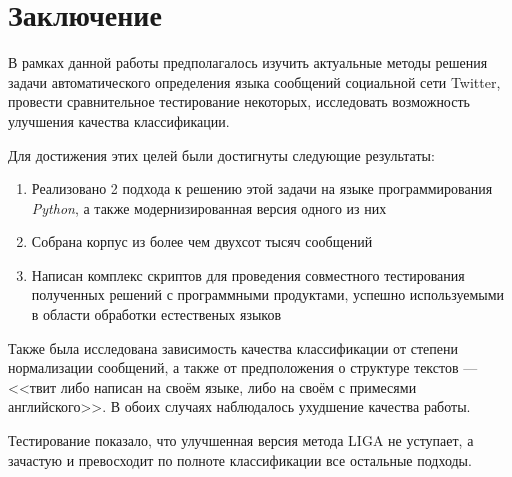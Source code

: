 \documentclass[a4paper, 14pt]{article}
\begin{document}
\section{Заключение}
		В рамках данной работы предполагалось изучить актуальные методы решения задачи автоматического определения языка сообщений социальной сети Twitter, провести сравнительное тестирование некоторых, исследовать возможность улучшения качества классификации. 
		
		Для достижения этих целей были достигнуты следующие результаты:
		\begin{enumerate}
			\item Реализовано 2 подхода к решению этой задачи на языке программирования \textit{Python}, а также модернизированная версия одного из них
			\item Собрана корпус из более чем двухсот тысяч сообщений
			\item Написан комплекс скриптов для проведения совместного тестирования полученных решений с программными продуктами, успешно используемыми в области обработки естественых языков
		\end{enumerate}
		Также была исследована зависимость качества классификации от степени нормализации сообщений, а также от предположения о структуре текстов ---
		<<твит либо написан на своём языке, либо на своём с примесями английского>>. В обоих случаях наблюдалось ухудшение качества работы.
		
		Тестирование показало, что улучшенная версия метода LIGA не уступает, а зачастую и превосходит по полноте классификации все остальные подходы.
		
		
\end{document}
